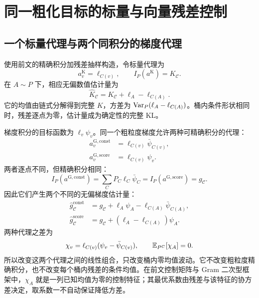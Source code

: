 \section{同一粗化目标的标量与向量残差控制}
\label{est:partition-controls}
\subsection{一个标量代理与两个同积分的梯度代理}

使用前文的精确积分加残差抽样构造，令标量代理为
\begin{equation*}
 a^{\mathrm K}_v=\ell_{C(v)},\qquad
 I_P(a^{\mathrm K})=K_{\mathcal C}.
\end{equation*}
在 $A\sim P$ 下，相应无偏数值估计量为
\begin{equation*}
 \widehat K_{\mathcal C}
 =K_{\mathcal C}+\ell_A-\ell_{C(A)}.
\end{equation*}
它的均值由链式分解得到完整 $K$，方差为 $\operatorname{Var}_P(\ell_A-\ell_{C(A)})$。桶内条件形状相同时，残差逐点为零，估计量成为确定性的完整 KL。

梯度积分的目标函数为 $\ell_v\psi_v$。同一个粗粒度梯度允许两种可精确积分的代理：
\begin{align*}
 a^{\mathrm{G,const}}_v&=\ell_{C(v)}\bar\psi_{C(v)},\\
 a^{\mathrm{G,score}}_v&=\ell_{C(v)}\psi_v.
\end{align*}
两者逐点不同，但精确积分相同：
\begin{equation*}
 I_P(a^{\mathrm{G,const}})
 =\sum_CP_C\ell_C\bar \psi_C
 =I_P(a^{\mathrm{G,score}})=g_{\mathcal C}.
\end{equation*}
因此它们产生两个不同的无偏梯度估计量：
\begin{align}
 \widehat g_{\mathcal C}^{\mathrm{const}}
 &=g_{\mathcal C}+\ell_A\psi_A-\ell_{C(A)}\bar\psi_{C(A)},
 \label{inf:eq:kl-partition-constant-estimator}\\
 \widehat g_{\mathcal C}^{\mathrm{score}}
 &=g_{\mathcal C}+(\ell_A-\ell_{C(A)})\psi_A.
 \label{inf:eq:kl-partition-score-estimator}
\end{align}
两种代理之差为
\begin{equation*}
 \chi_v=\ell_{C(v)}(\psi_v-\bar\psi_{C(v)}),
 \qquad \mathbb E_{P^C}[\chi_A]=0.
\end{equation*}
所以改变这两个代理之间的线性组合，只改变桶内零均值波动。它不改变粗粒度精确积分，也不改变每个桶内残差的条件均值。在前文控制矩阵与 Gram 二次型框架中，$\chi_A$ 就是一列已知均值为零的控制特征；其最优系数由残差与该特征的协方差决定，取系数一不自动保证降低方差。

